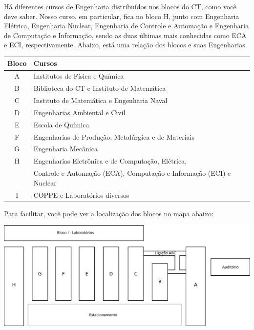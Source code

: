         Há diferentes cursos de Engenharia distribuídos nos blocos do CT, como você deve saber. Nosso curso, em particular, fica no bloco H, junto com Engenharia Elétrica, Engenharia Nuclear, Engenharia de Controle e Automação e Engenharia de Computação e Informação, sendo as duas últimas mais conhecidas como ECA e ECI, respectivamente. Abaixo, está uma relação dos blocos e suas Engenharias.   
        \begin{table} [!h]
        \centering
        \begin{tabular}{c | l} 
        Bloco & Cursos \\
        \hline
        A & Institutos de Física e Química \\
        B & Biblioteca do CT e Instituto de Matemática\\
        C & Instituto de Matemática e Engenharia Naval\\
        D & Engenharias Ambiental e Civil \\ 
        E & Escola de Química \\
        F & Engenharias de Produção, Metalúrgica e de Materiais \\
        G & Engenharia Mecânica \\
        H & Engenharias Eletrônica e de Computação, Elétrica, \\
        & Controle e Automação (ECA), Computação e Informação (ECI) e Nuclear \\       
        I & COPPE e Laboratórios diversos
        \end{tabular}
        \end{table}

        Para facilitar, você pode ver a localização dos blocos no mapa abaixo:
        
        \begin{center}        	
            \includegraphics[width=\textwidth]{assets/mapa-ct.png}
        \end{center}

